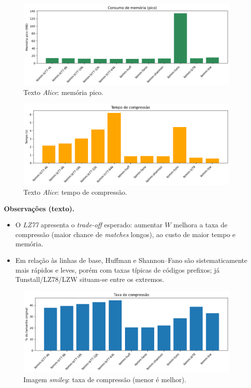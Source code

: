 \begin{figure}[htp]
  \centering
  \caption{Texto \textit{Alice}: memória pico.}
  \label{fig:komm-alice-memory}
  \includegraphics[width=15cm]{figuras/komm_alice_memory.png}
\end{figure}

\begin{figure}[htp]
  \centering
  \caption{Texto \textit{Alice}: tempo de compressão.}
  \label{fig:komm-alice-time}
  \includegraphics[width=15cm]{figuras/komm_alice_time.png}
\end{figure}

\noindent\textbf{Observações (texto).}
\begin{itemize}
  \item O \textit{LZ77} apresenta o \emph{trade-off} esperado: aumentar \(W\) melhora a taxa de compressão (maior chance de \emph{matches} longos), ao custo de maior tempo e memória.
  \item Em relação às linhas de base, Huffman e Shannon--Fano são sistematicamente mais rápidos e leves, porém com taxas típicas de códigos prefixos; já Tunstall/LZ78/LZW situam-se entre os extremos.
\end{itemize}

\begin{figure}[htp]
  \centering
  \caption{Imagem \textit{smiley}: taxa de compressão (menor é melhor).}
  \label{fig:komm-smiley-compression}
  \includegraphics[width=15cm]{figuras/komm_smiley_compression.png}
\end{figure}

